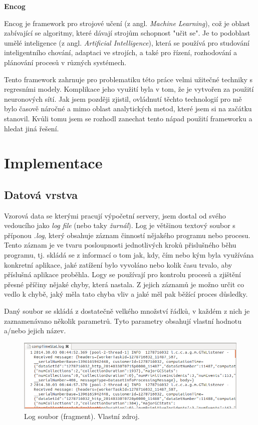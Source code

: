 \documentclass[a4paper,12pt,twoside]{scrreprt}
\begin{document}
\newpage
\textbf{Encog}

Encog je framework pro strojové učení (z angl. \textit{Machine Learning}), což je oblast zabívající se algoritmy, které dávají strojům schopnost "učit se". Je to podoblast umělé inteligence (z angl. \textit{Artificial Intelligence}), která se používá pro studování inteligentního chování, adaptaci ve strojích, a také pro řízení, rozhodování a plánování procesů v různých systémech.

Tento framework zahrnuje pro problematiku této práce velmi užitečné techniky s regresními modely. Komplikace jeho využití byla v tom, že je vytvořen za použití neuronových sítí. Jak jsem později zjistil, ovládnutí těchto technologií pro mě bylo časově náročné a mimo oblast analytických metod, které jsem si na začátku stanovil. Kvůli tomu jsem se rozhodl zanechat tento nápad použití frameworku a hledat jiná řešení. 


\newpage
\section{Implementace}
\subsection{Datová vrstva}
Vzorová data se kterými pracují výpočetní servery, jsem dostal od svého vedoucího jako \textit{log file} (nebo taky \textit{žurnál}). Log je většinou textový soubor s příponou \textit{.log}, který obsahuje záznam činností nějakého programu nebo procesu. Tento záznam je ve tvaru posloupnosti jednotlivých kroků přislušného běhu programu, tj. skládá se z informací o tom jak, kdy, čím nebo kým byla využívána konkretní aplikace, jaké zatížení bylo vyvoláno nebo kolik času trvalo, aby příslušná aplikace proběhla. Logy se používají pro kontrolu procesů a zjištění přesné příčiny nějaké chyby, která nastala. Z jejich záznamů je možno určit co vedlo k chybě, jaký měla tato chyba vliv a jaké měl pak běžící proces důsledky. 

Daný soubor se skládá z dostatečně velkého množství řádků, v každém z nich je zaznamenávano několik parametrů. Tyto parametry obsahují vlastní hodnotu a/nebo jejich název. 

\begin{figure}[h]
  \centering
  \includegraphics[width=15cm]{pictures/log.png}
  \caption{Log soubor (fragment). Vlastní zdroj.}
  \label{fig:log}
\end{figure}
\end{document}

